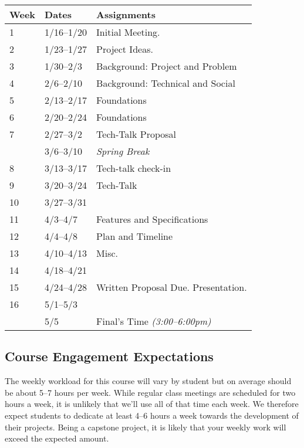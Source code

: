 \documentclass[10pt]{article}
\begin{document}
\begin{center}
\begin{tabular}{lll}
Week & Dates & Assignments \\ \toprule
1 & 1/16--1/20 &  Initial Meeting.  \\
2 & 1/23--1/27 & Project Ideas. \\
3 & 1/30--2/3 & Background: Project and Problem \\
4 & 2/6--2/10 & Background: Technical and Social \\
5 & 2/13--2/17 & Foundations \\
6 & 2/20--2/24 & Foundations  \\
7 & 2/27--3/2 & Tech-Talk Proposal \\
 & 3/6--3/10 & \textit{Spring Break} \\
8 & 3/13--3/17  & Tech-talk check-in \\
9 & 3/20--3/24 & Tech-Talk   \\
10 & 3/27--3/31 &  \\
11 & 4/3--4/7 &  Features and Specifications\\
12 & 4/4--4/8 &  Plan and Timeline   \\
13 & 4/10--4/13 & Misc. \\
14 & 4/18--4/21 & \\
15 & 4/24--4/28 & Written Proposal Due. Presentation. \\
16 & 5/1--5/3 &   \\ \midrule
  & 5/5 & Final's Time \textit{(3:00--6:00pm)}  \\
\end{tabular}
\end{center}

\subsection{Course Engagement Expectations}

The weekly workload for this course will vary by student but on average should be about 5--7 hours per week.  While regular class meetings are scheduled for two hours a week, it is unlikely that we'll use all of that time each week.  We therefore expect students to dedicate at least 4--6 hours a week towards the development of their projects.  Being a capstone project, it is likely that your weekly work will exceed the expected amount.
\end{document}
